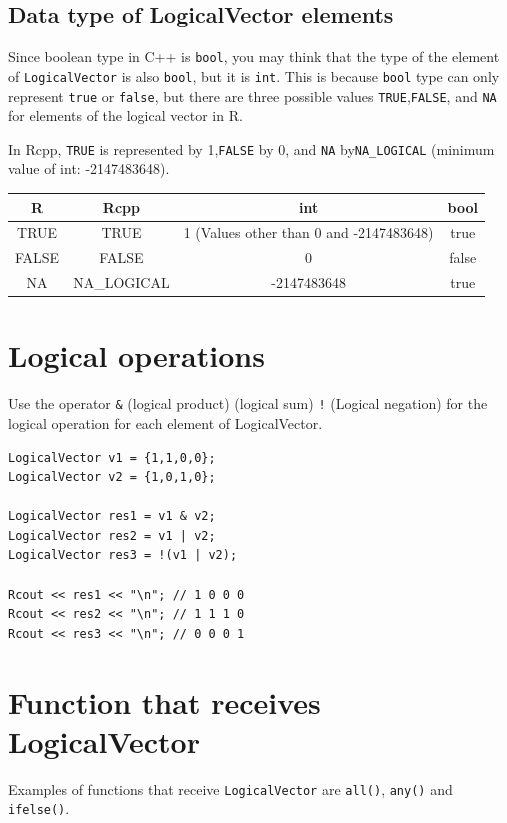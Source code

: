 \documentclass[]{book}
\theoremstyle{definition}
\theoremstyle{definition}
\theoremstyle{remark}
\begin{document}
\subsection{Data type of LogicalVector
elements}\label{data-type-of-logicalvector-elements}

Since boolean type in C++ is \texttt{bool}, you may think that the type
of the element of \texttt{LogicalVector} is also \texttt{bool}, but it
is \texttt{int}. This is because \texttt{bool} type can only represent
\texttt{true} or \texttt{false}, but there are three possible values
\texttt{TRUE},\texttt{FALSE}, and \texttt{NA} for elements of the
logical vector in R.

In Rcpp, \texttt{TRUE} is represented by 1,\texttt{FALSE} by 0, and
\texttt{NA} by\texttt{NA\_LOGICAL} (minimum value of int: -2147483648).

\begin{longtable}[]{@{}cccc@{}}
\toprule
R & Rcpp & int & bool\tabularnewline
\midrule
\endhead
TRUE & TRUE & 1 (Values other than 0 and -2147483648) &
true\tabularnewline
FALSE & FALSE & 0 & false\tabularnewline
NA & NA\_LOGICAL & -2147483648 & true\tabularnewline
\bottomrule
\end{longtable}

\section{Logical operations}\label{logical-operations-1}

Use the operator \texttt{\&} (logical product) \texttt{\textbar{}}
(logical sum) \texttt{!} (Logical negation) for the logical operation
for each element of LogicalVector.

\begin{verbatim}
LogicalVector v1 = {1,1,0,0};
LogicalVector v2 = {1,0,1,0};

LogicalVector res1 = v1 & v2;
LogicalVector res2 = v1 | v2;
LogicalVector res3 = !(v1 | v2);

Rcout << res1 << "\n"; // 1 0 0 0
Rcout << res2 << "\n"; // 1 1 1 0
Rcout << res3 << "\n"; // 0 0 0 1
\end{verbatim}

\section{Function that receives
LogicalVector}\label{function-that-receives-logicalvector}

Examples of functions that receive \texttt{LogicalVector} are
\texttt{all()}, \texttt{any()} and \texttt{ifelse()}.
\end{document}
